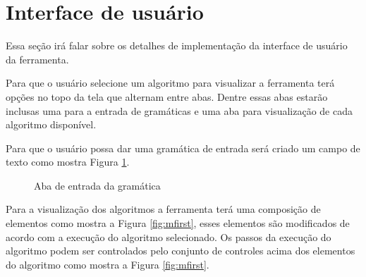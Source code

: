 \section{Interface de usuário}
Essa seção irá falar sobre os detalhes de implementação da interface de usuário da ferramenta. 

Para que o usuário selecione um algoritmo para visualizar a ferramenta terá opções no topo da tela que alternam entre abas. Dentre essas abas estarão inclusas uma para a entrada de gramáticas e uma aba para visualização de cada algoritmo disponível.

Para que o usuário possa dar uma gramática de entrada será criado um campo de texto como mostra Figura \ref{fig:mgrammar}.

\begin{figure}[ht]
    \centering
    \captionsetup{width=16cm}
    \caption{Aba de entrada da gramática}
    \label{fig:mgrammar}
\end{figure}
\FloatBarrier

Para a visualização dos algoritmos a ferramenta terá uma composição de elementos como mostra a Figura \ref{fig:mfirst}, esses elementos são modificados de acordo com a execução do algoritmo selecionado. Os passos da execução do algoritmo podem ser controlados pelo conjunto de controles acima dos elementos do algoritmo como mostra a Figura \ref{fig:mfirst}.

